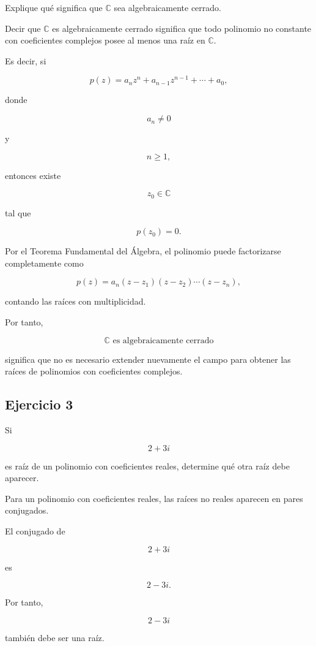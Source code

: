 \documentclass[12pt]{article}
\begin{document}
Explique qué significa que \(\mathbb{C}\) sea algebraicamente cerrado.

Decir que \(\mathbb{C}\) es algebraicamente cerrado significa que todo
polinomio no constante con coeficientes complejos posee al menos una
raíz en \(\mathbb{C}\).

Es decir, si

\[
p(z)
=
a_nz^n+a_{n-1}z^{n-1}+\cdots+a_0,
\]

donde

\[
a_n\neq0
\]

y

\[
n\geq1,
\]

entonces existe

\[
z_0\in\mathbb C
\]

tal que

\[
p(z_0)=0.
\]

Por el Teorema Fundamental del Álgebra, el polinomio puede factorizarse
completamente como

\[
p(z)
=
a_n
(z-z_1)(z-z_2)\cdots(z-z_n),
\]

contando las raíces con multiplicidad.

Por tanto,

\[
\boxed{
\mathbb C\text{ es algebraicamente cerrado}
}
\]

significa que no es necesario extender nuevamente el campo para obtener
las raíces de polinomios con coeficientes complejos.


\subsection*{Ejercicio 3}

Si

\[
2+3i
\]

es raíz de un polinomio con coeficientes reales, determine qué otra
raíz debe aparecer.

Para un polinomio con coeficientes reales, las raíces no reales aparecen
en pares conjugados.

El conjugado de

\[
2+3i
\]

es

\[
2-3i.
\]

Por tanto,

\[
\boxed{2-3i}
\]

también debe ser una raíz.

\end{document}
